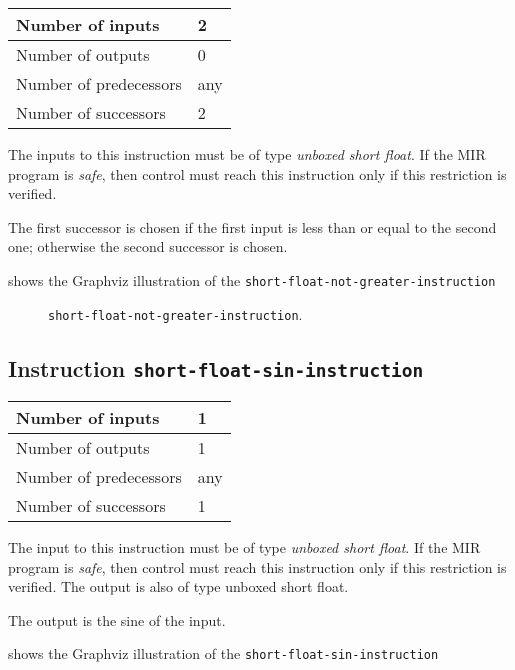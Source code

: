 \begin{tabular}{|l|l|}
\hline
Number of inputs & 2\\
\hline
Number of outputs & 0\\
\hline
Number of predecessors & any\\
\hline
Number of successors & 2\\
\hline
\end{tabular}

The inputs to this instruction must be of type \emph{unboxed short
  float}.  If the MIR program is \emph{safe}, then control must reach
this instruction only if this restriction is verified.

The first successor is chosen if the first input is less than or equal
to the second one; otherwise the second successor is chosen.

 shows the Graphviz illustration of the
\texttt{short-float-not-greater-instruction}

\begin{figure}
\begin{center}
\end{center}
\caption{\label{fig-short-float-not-greater-instruction}
\texttt{short-float-not-greater-instruction}.}
\end{figure}

\subsection{Instruction \texttt{short-float-sin-instruction}}
\label{mir-instruction-short-float-div}

\begin{tabular}{|l|l|}
\hline
Number of inputs & 1\\
\hline
Number of outputs & 1\\
\hline
Number of predecessors & any\\
\hline
Number of successors & 1\\
\hline
\end{tabular}

The input to this instruction must be of type \emph{unboxed short
  float}.  If the MIR program is \emph{safe}, then control must reach
this instruction only if this restriction is verified.  The output is
also of type unboxed short float.

The output is the sine of the input.

 shows the Graphviz illustration of the
\texttt{short-float-sin-instruction}

